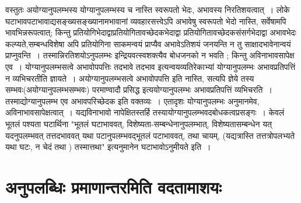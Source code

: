 {वस्तुतः अयोग्यानुपलम्भस्य योग्यानुपलम्भस्य च नास्ति स्वरूपतो भेदः, अभावस्य \-निरतिशयत्वात्~। लोके घटाभावपटाभावाद्यसङ्ख्यसङ्ख्यानामभावानां व्यवहारसत्त्वेऽपि \-अभावेषु स्वरूपतो भेदो नास्ति, सर्वेषामपि भावभिन्नरूपत्वात्; किन्तु प्रतियोगिभेदाद्वा\break प्रतियोगितावच्छेदकभेदाद्वा प्रतियोगितावच्छेदकसंसर्गभेदाद्वा अभावभेदः कल्प्यते,\break सम्बन्धविशेषा अपि प्रतियोगिना साकमन्वयं प्राप्यैव अभावेऽतिशयं जनयन्ति न तु साक्षाद\-भावेनान्वयं प्राप्नुवन्ति~। तस्मान्निरतिशयोऽनुपलम्भः इन्द्रियवत्स्वशक्त्यैव बोधजनको न \break भवति ; किन्तु अविनाभावसापेक्ष एव~। योग्यानुपलम्भसत्वे अभावोपपत्तिः तदभावे तदभाव इत्यन्वयव्यतिरेकाभ्यां योग्यानुपलम्भः अभावप्रतिपत्तिं न व्यभिचरतीति ज्ञायते~। अयोग्यानुपलम्भसत्वे अभावोपपत्ति इति नास्ति, सत्यपि ज्ञेये तस्य सम्भवः(अयोग्यानुपलम्भसम्भवः) \break परमाण्वादौ प्रसिद्ध इत्ययोग्यानुपलम्भः अभावप्रतिपत्तिं व्यभिचरति~। तस्माद्योग्यानुपलम्भ एव अभावपरिच्छेदक इति वक्तव्यः~। एतादृशः योग्यानुपलम्भः अनुमानमेव, अविनाभावसापेक्षत्वात्~। यद्यविनाभावो नापेक्षितस्तर्हि तस्यायोग्यानुपलम्भवदबोधकत्वप्रसङ्गः~। केवलं भूतलं पश्यता घटार्थिना "भूतलं घटाभाववत्, विशेष्यता-सम्बन्धेनानुपलम्भात्, विशेष्यता\-सम्बन्धेन यत् यदनुपलम्भवत् तत्तदभाववत् यथा पटानुपलम्भवद्भूतलं पटाभाववत्, तथा \-चायम्, (यद्यत्रास्ति तत्तत्रोपलभ्यते यथा घटः, न चेदं तथा ) तस्मात्तथा" इत्यनुमानेन \break घटाभावोऽनुमीयते इति~। 

\section*{अनुपलब्धिः प्रमाणान्तरमिति वदतामाशयः} 

}
